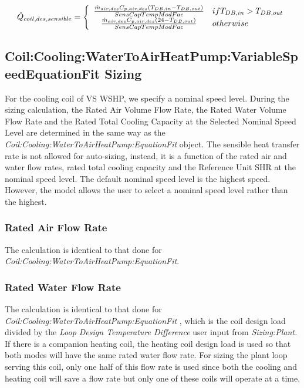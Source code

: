 \begin{equation}
  \dot{Q}_{coil,des,sensible} = \left\{
                                  \begin{array}{cl}
                                    \frac{\dot{m}_{air,des}C_{p,air,des}\PB{T_{DB,in}-T_{DB,out}}}{SensCapTempModFac}  & if T_{DB,in}>T_{DB,out} \\
                                    \frac{\dot{m}_{air,des}C_{p,air,des}\PB{24       -T_{DB,out}}}{SensCapTempModFac}  & otherwise
                                  \end{array}
                                \right.
\end{equation}

\subsection{Coil:Cooling:WaterToAirHeatPump:VariableSpeedEquationFit Sizing}\label{coilcoolingwatertoairheatpumpvariablespeedequationfit-sizing}

For the cooling coil of VS WSHP, we specify a nominal speed level. During the sizing calculation, the Rated Air Volume Flow Rate, the Rated Water Volume Flow Rate and the Rated Total Cooling Capacity at the Selected Nominal Speed Level are determined in the same way as the \emph{Coil:Cooling:WaterToAirHeatPump:EquationFit} object. The sensible heat transfer rate is not allowed for auto-sizing, instead, it is a function of the rated air and water flow rates, rated total cooling capacity and the Reference Unit SHR at the nominal speed level. The default nominal speed level is the highest speed. However, the model allows the user to select a nominal speed level rather than the highest.

\subsubsection{Rated Air Flow Rate}\label{rated-air-flow-rate-1}

The calculation is identical to that done for \emph{Coil:Cooling:WaterToAirHeatPump:EquationFit}.

\subsubsection{Rated Water Flow Rate}\label{rated-water-flow-rate-1}

The calculation is identical to that done for \emph{Coil:Cooling:WaterToAirHeatPump:EquationFit} , which is the coil design load divided by the \emph{Loop Design Temperature Difference} user input from \emph{Sizing:Plant.} If there is a companion heating coil, the heating coil design load is used so that both modes will have the same rated water flow rate. For sizing the plant loop serving this coil, only one half of this flow rate is used since both the cooling and heating coil will save a flow rate but only one of these coils will operate at a time.

